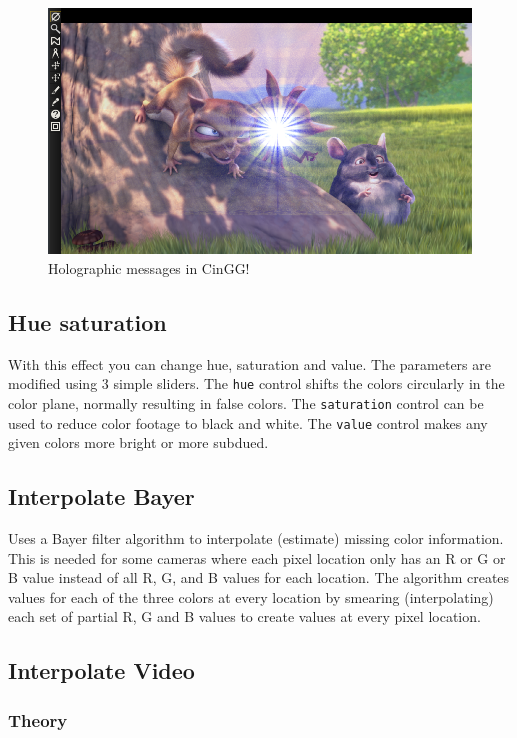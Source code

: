 \begin{figure}[htpb]
    \centering
    \includegraphics[width=0.8\linewidth]{images/holographictv.png}
    \caption{Holographic messages in CinGG!}
    \label{fig:holographictv}
\end{figure}

\subsection{Hue saturation}%
\label{sub:hue_saturation}

With this effect you can change hue, saturation and value. The parameters are modified using 3 simple sliders. The \texttt{hue} control shifts the colors circularly in the color plane, normally resulting in false colors. The \texttt{saturation} control can be used to reduce color footage to black and white. The \texttt{value} control makes any given colors more bright or more subdued.

\subsection{Interpolate Bayer}%
\label{sub:interpolate_bayer}

Uses a Bayer filter algorithm to interpolate (estimate) missing color information. This is needed for some cameras where each pixel location only has an R or G or B value instead of all R, G, and B values for each location. The algorithm creates values for each of the three colors at every location by smearing (interpolating) each set of partial R, G and B values to create values at every pixel location.

\subsection{Interpolate Video}%
\label{sub:interpolate_video}

\subsubsection*{Theory}
\label{ssub:theory}

